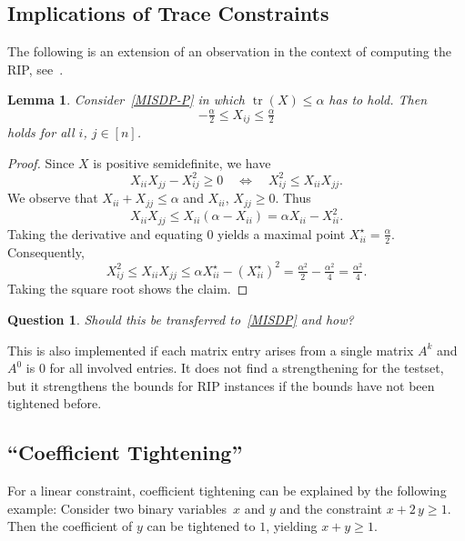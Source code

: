 \documentclass[10pt, a4paper]{article}
\DeclareMathOperator{\tr}{tr}
\newtheorem{lemma}[theorem]{Lemma}
\newtheorem{question}[theorem]{Question}
\begin{document}
\subsection{Implications of Trace Constraints}

The following is an extension of an observation in the context of computing
the RIP, see~\cite{GalP16}.

\begin{lemma}
  Consider~\eqref{MISDP-P} in which $\tr(X) \leq \alpha$ has to hold. Then
  \[
    -\tfrac{\alpha}{2} \leq X_{ij} \leq \tfrac{\alpha}{2}
  \]
  holds for all $i$, $j \in [n]$.
\end{lemma}

\begin{proof}
  Since $X$ is positive semidefinite, we have
  \[
    X_{ii} X_{jj} - X_{ij}^2 \geq 0
    \quad\Leftrightarrow\quad
    X_{ij}^2 \leq X_{ii} X_{jj}.
  \]
  We observe that $X_{ii} + X_{jj} \leq \alpha$ and $X_{ii}$,
  $X_{jj} \geq 0$. Thus
  \[
    X_{ii} X_{jj} \leq X_{ii} (\alpha - X_{ii}) = \alpha X_{ii} - X_{ii}^2.
  \]
  Taking the derivative and equating 0 yields a maximal point
  $X_{ii}^\star = \tfrac{\alpha}{2}$. Consequently,
  \[
    X_{ij}^2 \leq X_{ii} X_{jj} \leq \alpha X_{ii}^\star - (X_{ii}^\star)^2 =
    \tfrac{\alpha^2}{2} - \tfrac{\alpha^2}{4} = \tfrac{\alpha^2}{4}.
  \]
  Taking the square root shows the claim.
\end{proof}

\begin{question}
  Should this be transferred to~\eqref{MISDP} and how?
\end{question}

This is also implemented if each matrix entry arises from a single matrix
$A^k$ and $A^0$ is 0 for all involved entries. It does not find a
strengthening for the testset, but it strengthens the bounds for RIP
instances if the bounds have not been tightened before.

\subsection{``Coefficient Tightening''}
\label{sec:CoefficientTightening}

For a linear constraint, coefficient tightening can be explained by the
following example: Consider two binary variables~$x$ and $y$ and the
constraint $x + 2\, y \geq 1$. Then the coefficient of $y$ can be tightened
to $1$, yielding $x + y \geq 1$.
\end{document}
